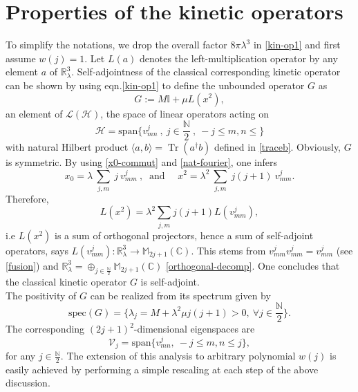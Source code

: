 \documentclass[a4paper,11pt,twoside]{article}
\numberwithin{equation}{section}
\newcommand\bbone{{ \mathbb{I}}}
\DeclareMathOperator{\tr}{Tr}
\theoremstyle{nonumberplain}
\newcounter{and}
\begin{document}
\section{Properties of the kinetic operators}\label{operators}
To simplify the notations, we drop the overall factor $8\pi\lambda^3$ in \eqref{kin-op1} and first assume $w(j)=1$. Let $L(a)$ denotes the left-multiplication operator by any element $a$ of $\mathbb{R}^3_\lambda$. Self-adjointness of the classical corresponding kinetic operator can be shown by using eqn.\eqref{kin-op1} to define the unbounded operator $G$ as%
%
\begin{equation}
G:= M \bbone + \mu L(x^2) \label{kinet-harmonic},
\end{equation}
%
an element of $\mathcal{L}(\mathcal{H})$, the space of linear operators acting on 
\begin{equation*}
\mathcal{H}=\text{span}\{v^j_{mn} \ , \ j\in\frac{\mathbb{N}}{2} \ , \ -j\le m,n\le \} 
\end{equation*}
%
with natural Hilbert product $\langle a,b \rangle = \tr(a^\dag b)$ defined in \eqref{traceb}. Obviously, $G$ is symmetric. By using \eqref{x0-commut} and \eqref{nat-fourier}, one infers%
%
\begin{equation}
x_0 = \lambda \ \sum_{j,m} \ j \ v^j_{mm} \ , \ \mbox{ and } \quad x^2 = \lambda^2 \ \sum_{j,m} \ j(j+1) \ v^j_{mm}.
\end{equation}
%
Therefore, 
\begin{equation}
L(x^2)=\lambda^2\sum_{j,m}j(j+1)L(v^j_{mm}),
\end{equation}
i.e $L(x^2)$ is a sum of orthogonal projectors, hence a sum of self-adjoint operators, says $L(v^j_{mm}):\mathbb{R}^3_\lambda\to\mathbb{M}_{2j+1}(\mathbb{C})$. This stems from $v^j_{mm}v^j_{mm}=v^j_{mm}$ (see \eqref{fusion}) and $\mathbb{R}^3_\lambda=\oplus_{j\in\frac{\mathbb{N}}{2}}\mathbb{M}_{2j+1}(\mathbb{C})$ \eqref{orthogonal-decomp}. One concludes that the classical kinetic operator $G$ is self-adjoint.\\
The positivity of $G$ can be realized from its spectrum given by%
%
\begin{equation}
\text{spec}(G)=\{ \lambda_j = M + \lambda^2 \mu j(j+1) >0 , \ \forall j \in \frac{\mathbb{N}}{2}\}.\label{spect-G}
\end{equation}
The corresponding $(2j+1)^2$-dimensional eigenspaces are
\begin{equation}
\mathcal{V}_{j} = \text{span}\{ v^j_{mn}, \ -j\le m,n\le j \},\label{eigensp-G}
\end{equation}
for any $j\in\frac{\mathbb{N}}{2}$. The extension of this analysis to arbitrary polynomial $w(j)$ is easily achieved by performing a simple rescaling at each step of the above discussion.\par 
\end{document}
